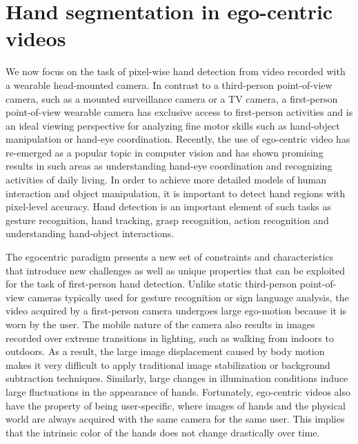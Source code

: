 
\chapter{Hand segmentation in ego-centric videos}


We now focus on the task of pixel-wise hand detection
from video recorded with a wearable head-mounted
camera. In contrast to a third-person point-of-view camera,
such as a mounted surveillance camera or a TV camera,
a first-person point-of-view wearable camera has exclusive
access to first-person activities and is an ideal viewing perspective
for analyzing fine motor skills such as hand-object
manipulation or hand-eye coordination. Recently, the use of
ego-centric video has re-emerged as a popular topic in computer
vision and has shown promising results in such areas
as understanding hand-eye coordination and recognizing
activities of daily living. In order to achieve more
detailed models of human interaction and object manipulation,
it is important to detect hand regions with pixel-level
accuracy. Hand detection is an important element of such
tasks as gesture recognition, hand tracking, grasp recognition,
action recognition and understanding hand-object interactions.

The egocentric
paradigm presents a new set of constraints and characteristics
that introduce new challenges as well as unique
properties that can be exploited for the task of first-person
hand detection. Unlike static third-person point-of-view
cameras typically used for gesture recognition or sign language
analysis, the video acquired by a first-person camera
undergoes large ego-motion because it is worn by the
user. The mobile nature of the camera also results in images
recorded over extreme transitions in lighting, such as
walking from indoors to outdoors. As a result, the large image displacement caused by body motion makes it very difficult
to apply traditional image stabilization or background
subtraction techniques. Similarly, large changes in illumination
conditions induce large fluctuations in the appearance
of hands. Fortunately, ego-centric videos also have the
property of being user-specific, where images of hands and
the physical world are always acquired with the same camera
for the same user. This implies that the intrinsic color
of the hands does not change drastically over time.

